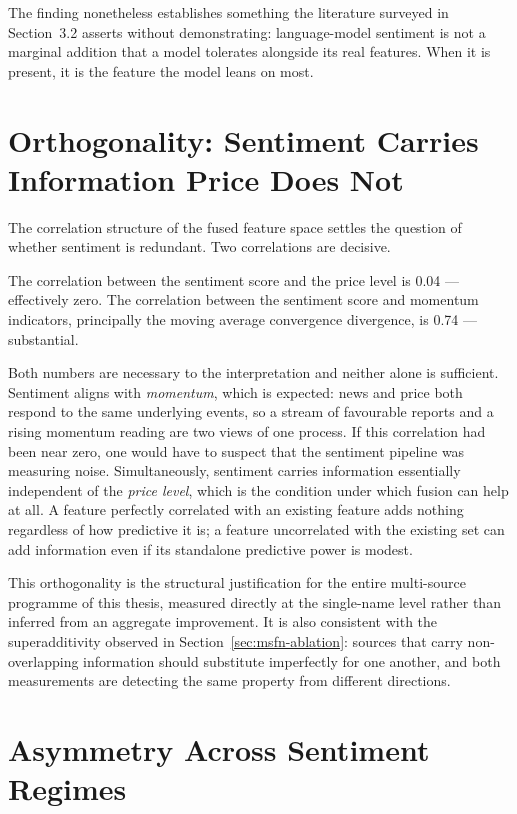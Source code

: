 The finding nonetheless establishes something the literature surveyed in Section~3.2 asserts
without demonstrating: language-model sentiment is not a marginal addition that a model tolerates
alongside its real features. When it is present, it is the feature the model leans on most.

\section{Orthogonality: Sentiment Carries Information Price Does Not}
\label{sec:llm-orthogonality}

The correlation structure of the fused feature space settles the question of whether sentiment is
redundant. Two correlations are decisive.

The correlation between the sentiment score and the price level is 0.04 --- effectively zero. The
correlation between the sentiment score and momentum indicators, principally the moving average
convergence divergence, is 0.74 --- substantial.

Both numbers are necessary to the interpretation and neither alone is sufficient. Sentiment aligns
with \emph{momentum}, which is expected: news and price both respond to the same underlying
events, so a stream of favourable reports and a rising momentum reading are two views of one
process. If this correlation had been near zero, one would have to suspect that the sentiment
pipeline was measuring noise. Simultaneously, sentiment carries information essentially
independent of the \emph{price level}, which is the condition under which fusion can help at all.
A feature perfectly correlated with an existing feature adds nothing regardless of how predictive
it is; a feature uncorrelated with the existing set can add information even if its standalone
predictive power is modest.

This orthogonality is the structural justification for the entire multi-source programme of this
thesis, measured directly at the single-name level rather than inferred from an aggregate
improvement. It is also consistent with the superadditivity observed in
Section~\ref{sec:msfn-ablation}: sources that carry non-overlapping information should
substitute imperfectly for one another, and both measurements are detecting the same property from
different directions.

\section{Asymmetry Across Sentiment Regimes}
\label{sec:llm-regimes}

